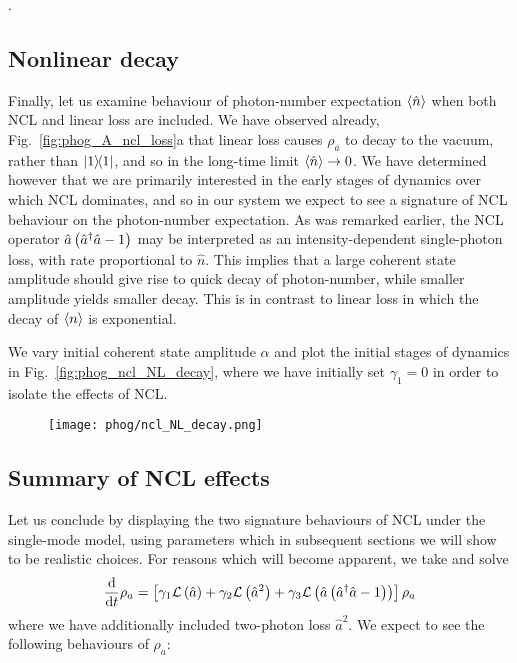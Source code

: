 .

\subsection{Nonlinear decay}

Finally, let us examine behaviour of photon-number expectation $\ev{\hat{n}}$ when both NCL and linear loss are included. We have observed already, Fig.~\ref{fig:phog_A_ncl_loss}a that linear loss causes $\rho_a$ to decay to the vacuum, rather than $\dyad{1}$, and so in the long-time limit $\ev{\hat{n}} \rightarrow 0$. We have determined however that we are primarily interested in the early stages of dynamics over which NCL dominates, and so in our system we expect to see a signature of NCL behaviour on the photon-number expectation. As was remarked earlier, the NCL operator $\hat{a}\left(\hat{a}^\dagger \hat{a} - 1\right)$ may be interpreted as an intensity-dependent single-photon loss, with rate proportional to $\hat{n}$. This implies that a large coherent state amplitude should give rise to quick decay of photon-number, while smaller amplitude yields smaller decay. This is in contrast to linear loss in which the decay of $\ev{n}$ is exponential. 

We vary initial coherent state amplitude $\alpha$ and plot the initial stages of dynamics in Fig.~\ref{fig:phog_ncl_NL_decay}, where we have initially set $\gamma_1=0$ in order to isolate the effects of NCL. 

\begin{figure}[htp]
\centering
\texttt{[image: phog/ncl\_NL\_decay.png]}
\end{figure}


\subsection{Summary of NCL effects}
Let us conclude by displaying the two signature behaviours of NCL under the single-mode model, using parameters which in subsequent sections we will show to be realistic choices. For reasons which will become apparent, we take  and solve
\begin{equation}\label{eqn:phog_full_single_mode}
\frac{\mathrm{d}}{\mathrm{d}t} \rho_a = \left[\gamma_1 \mathcal{L}\left(\hat{a}\right) + \gamma_2 \mathcal{L}\left(\hat{a}^2\right) + \gamma_3 \mathcal{L}\left(\hat{a}\left(\hat{a}^\dagger \hat{a} - 1\right)\right) \right] \rho_a
\end{equation}
where we have additionally included two-photon loss $\hat{a}^2$. We expect to see the following behaviours of $\rho_a$:

